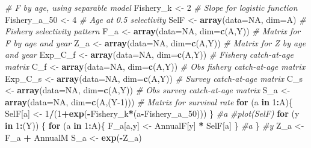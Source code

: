 \documentclass[
]{krantz}
\makeatletter
\newenvironment{Shaded}{\begin{snugshade}}{\end{snugshade}}
\newcommand{\AttributeTok}[1]{\textcolor[rgb]{0.27,0.27,0.27}{#1}}
\newcommand{\CommentTok}[1]{\textcolor[rgb]{0.37,0.37,0.37}{\textit{#1}}}
\newcommand{\ConstantTok}[1]{\textcolor[rgb]{0.37,0.37,0.37}{#1}}
\newcommand{\ControlFlowTok}[1]{\textcolor[rgb]{0.27,0.27,0.27}{\textbf{#1}}}
\newcommand{\DecValTok}[1]{\textcolor[rgb]{0.06,0.06,0.06}{#1}}
\newcommand{\FunctionTok}[1]{\textcolor[rgb]{0.27,0.27,0.27}{\textbf{#1}}}
\newcommand{\NormalTok}[1]{#1}
\newcommand{\OtherTok}[1]{\textcolor[rgb]{0.37,0.37,0.37}{#1}}
\newcommand{\SpecialCharTok}[1]{\textcolor[rgb]{0.43,0.43,0.43}{\textbf{#1}}}
\newenvironment{kframe}{%
\medskip{}
\setlength{\fboxsep}{.8em}
 \def\at@end@of@kframe{}%
 \ifinner\ifhmode%
  \def\at@end@of@kframe{\end{minipage}}%
  \begin{minipage}{\columnwidth}%
 \fi\fi%
 \def\FrameCommand##1{\hskip\@totalleftmargin \hskip-\fboxsep
 \colorbox{shadecolor}{##1}\hskip-\fboxsep
     \hskip-\linewidth \hskip-\@totalleftmargin \hskip\columnwidth}%
 \MakeFramed {\advance\hsize-\width
   \@totalleftmargin\z@ \linewidth\hsize
   \@setminipage}}%
 {\par\unskip\endMakeFramed%
 \at@end@of@kframe}
\renewenvironment{Shaded}{\begin{kframe}}{\end{kframe}}
\makeatother
\begin{document}
\begin{Shaded}
\begin{Highlighting}[]
\CommentTok{\# F by age, using separable model}
\NormalTok{Fishery\_k }\OtherTok{\textless{}{-}} \DecValTok{2} \CommentTok{\# Slope for logistic function}
\NormalTok{Fishery\_a\_50 }\OtherTok{\textless{}{-}} \DecValTok{4} \CommentTok{\# Age at 0.5 selectivity}
\NormalTok{SelF }\OtherTok{\textless{}{-}} \FunctionTok{array}\NormalTok{(}\AttributeTok{data=}\ConstantTok{NA}\NormalTok{, }\AttributeTok{dim=}\NormalTok{A) }\CommentTok{\# Fishery selectivity pattern}
\NormalTok{F\_a }\OtherTok{\textless{}{-}} \FunctionTok{array}\NormalTok{(}\AttributeTok{data=}\ConstantTok{NA}\NormalTok{, }\AttributeTok{dim=}\FunctionTok{c}\NormalTok{(A,Y)) }\CommentTok{\# Matrix for F by age and year}
\NormalTok{Z\_a }\OtherTok{\textless{}{-}} \FunctionTok{array}\NormalTok{(}\AttributeTok{data=}\ConstantTok{NA}\NormalTok{, }\AttributeTok{dim=}\FunctionTok{c}\NormalTok{(A,Y)) }\CommentTok{\# Matrix for Z by age and year}
\NormalTok{Exp\_C\_f }\OtherTok{\textless{}{-}} \FunctionTok{array}\NormalTok{(}\AttributeTok{data=}\ConstantTok{NA}\NormalTok{, }\AttributeTok{dim=}\FunctionTok{c}\NormalTok{(A,Y)) }\CommentTok{\# Fishery catch{-}at{-}age matrix}
\NormalTok{C\_f }\OtherTok{\textless{}{-}} \FunctionTok{array}\NormalTok{(}\AttributeTok{data=}\ConstantTok{NA}\NormalTok{, }\AttributeTok{dim=}\FunctionTok{c}\NormalTok{(A,Y)) }\CommentTok{\# Obs fishery catch{-}at{-}age matrix}
\NormalTok{Exp\_C\_s }\OtherTok{\textless{}{-}} \FunctionTok{array}\NormalTok{(}\AttributeTok{data=}\ConstantTok{NA}\NormalTok{, }\AttributeTok{dim=}\FunctionTok{c}\NormalTok{(A,Y)) }\CommentTok{\# Survey catch{-}at{-}age matrix}
\NormalTok{C\_s }\OtherTok{\textless{}{-}} \FunctionTok{array}\NormalTok{(}\AttributeTok{data=}\ConstantTok{NA}\NormalTok{, }\AttributeTok{dim=}\FunctionTok{c}\NormalTok{(A,Y)) }\CommentTok{\# Obs survey catch{-}at{-}age matrix}
\NormalTok{S\_a }\OtherTok{\textless{}{-}} \FunctionTok{array}\NormalTok{(}\AttributeTok{data=}\ConstantTok{NA}\NormalTok{, }\AttributeTok{dim=}\FunctionTok{c}\NormalTok{(A,(Y}\DecValTok{{-}1}\NormalTok{))) }\CommentTok{\# Matrix for survival rate}
\ControlFlowTok{for}\NormalTok{ (a }\ControlFlowTok{in} \DecValTok{1}\SpecialCharTok{:}\NormalTok{A)\{}
\NormalTok{  SelF[a] }\OtherTok{\textless{}{-}} \DecValTok{1}\SpecialCharTok{/}\NormalTok{(}\DecValTok{1}\SpecialCharTok{+}\FunctionTok{exp}\NormalTok{(}\SpecialCharTok{{-}}\NormalTok{Fishery\_k}\SpecialCharTok{*}\NormalTok{(a}\SpecialCharTok{{-}}\NormalTok{Fishery\_a\_50)))}
\NormalTok{\} }\CommentTok{\#a}
\CommentTok{\#plot(SelF)}
\ControlFlowTok{for}\NormalTok{ (y }\ControlFlowTok{in} \DecValTok{1}\SpecialCharTok{:}\NormalTok{(Y)) \{}
  \ControlFlowTok{for}\NormalTok{ (a }\ControlFlowTok{in} \DecValTok{1}\SpecialCharTok{:}\NormalTok{A)\{}
\NormalTok{    F\_a[a,y] }\OtherTok{\textless{}{-}}\NormalTok{ AnnualF[y] }\SpecialCharTok{*}\NormalTok{ SelF[a]}
\NormalTok{  \} }\CommentTok{\#a}
\NormalTok{\} }\CommentTok{\#y}
\NormalTok{Z\_a }\OtherTok{\textless{}{-}}\NormalTok{ F\_a }\SpecialCharTok{+}\NormalTok{ AnnualM}
\NormalTok{S\_a }\OtherTok{\textless{}{-}} \FunctionTok{exp}\NormalTok{(}\SpecialCharTok{{-}}\NormalTok{Z\_a)}


\end{Highlighting}
\end{Shaded}
\end{document}
